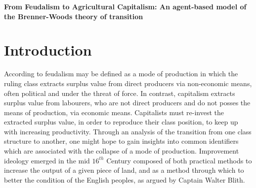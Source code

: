 \documentclass[11pt,english]{article}
\begin{document}
\begin{center}
\Large\textbf{From Feudalism to Agricultural Capitalism: An agent-based model of the Brenner-Woods theory of transition}
\end{center}

\begin{abstract}
    The results of the Brenner Debate produced an enhanced theory of transition from feudalism to capitalism based in rural $17^{th}$ Century England. A key tenant of this school of thought is the role of ``improvement" as both a motor in the divorce between peasants and their means of subsistence, and a consequence of newly created market imperatives both landlords and tenants were now subject too. To test the role of improvement ideology in the transition an agent based model is constructed. This incorporates tenants, landlords, ecological deterioration and rental markets. The critical role of rental market pressure is modelled through a transition from customary rent to leasehold rents. 
\end{abstract}
\section{Introduction}
According to \cite[p.10]{comninel2000english} feudalism may be defined as a mode of production in which the ruling class extracts surplus value from direct producers via non-economic means, often political and under the threat of force. In contrast, capitalism extracts surplus value from labourers, who are not direct producers and do not posses the means of production, via economic means. Capitalists must re-invest the extracted surplus value, in order to reproduce their class position, to keep up with increasing productivity. Through an analysis of the transition from one class structure to another, one might hope to gain insights into common identifiers which are associated with the collapse of a mode of production. Improvement ideology emerged in the mid $16^{th}$ Century composed of both practical methods to increase the output of a given piece of land, and as a method through which to better the condition of the English peoples, as argued by Captain Walter Blith.
\end{document}
